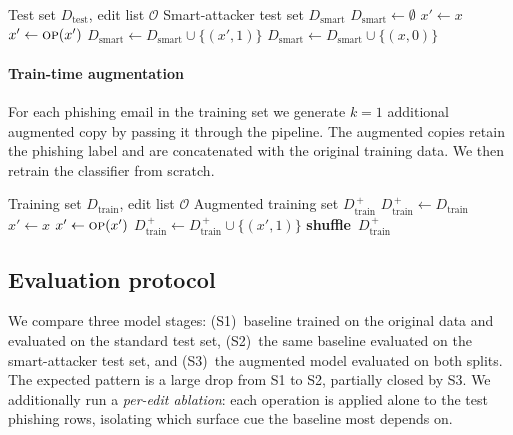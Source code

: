 \documentclass[conference]{IEEEtran}
\begin{document}
\begin{algorithm}[t]
\caption{Smart-attacker test split construction}
\label{alg:smart}
\begin{algorithmic}[1]
\Require Test set $D_{\text{test}}$, edit list $\mathcal{O}$
\Ensure  Smart-attacker test set $D_{\text{smart}}$
\State $D_{\text{smart}} \gets \emptyset$
    \State $x' \gets x$
      \State $x' \gets \textsc{op}(x')$ 
    \EndFor
    \State $D_{\text{smart}} \gets D_{\text{smart}} \cup \{(x', 1)\}$
  \Else
    \State $D_{\text{smart}} \gets D_{\text{smart}} \cup \{(x, 0)\}$
  \EndIf
\EndFor
\end{algorithmic}
\end{algorithm}

\paragraph{Train-time augmentation} For each phishing email in the training
set we generate $k\!=\!1$ additional augmented copy by passing it through the
pipeline. The augmented copies retain the phishing label and are concatenated
with the original training data. We then retrain the classifier from scratch.

\begin{algorithm}[t]
\caption{Train-time smart-attacker augmentation ($k\!=\!1$)}
\label{alg:augtrain}
\begin{algorithmic}[1]
\Require Training set $D_{\text{train}}$, edit list $\mathcal{O}$
\Ensure  Augmented training set $D_{\text{train}}^{\,+}$
\State $D_{\text{train}}^{\,+} \gets D_{\text{train}}$
  \State $x' \gets x$
    \State $x' \gets \textsc{op}(x')$ 
  \EndFor
  \State $D_{\text{train}}^{\,+} \gets D_{\text{train}}^{\,+} \cup \{(x', 1)\}$
\EndFor
\State \textbf{shuffle}~$D_{\text{train}}^{\,+}$
\end{algorithmic}
\end{algorithm}

\subsection{Evaluation protocol}
We compare three model stages: (S1)~baseline trained on the original data
and evaluated on the standard test set, (S2)~the same baseline evaluated on
the smart-attacker test set, and (S3)~the augmented model evaluated on both
splits. The expected pattern is a large drop from S1 to S2, partially closed
by S3. We additionally run a \emph{per-edit ablation}: each operation is
applied alone to the test phishing rows, isolating which surface cue the
baseline most depends on.
\end{document}
